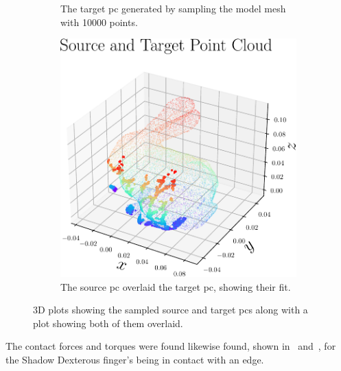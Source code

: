 \begin{figure}[!h]
\begin{subfigure}[b]{0.3\textwidth}
		\caption{The target \gls{pc} generated by sampling the model mesh with \num{10 000} points.}
		\label{fig:pc-target}
	\end{subfigure}
	\begin{subfigure}[b]{0.3\textwidth}
		\centering
		\includegraphics[width=\textwidth]{chapters/1-tactile-perception/fig/matplotlib/pc_source_target.pdf}
		\caption{The source \gls{pc} overlaid the target \gls{pc}, showing their fit.}
		\label{fig:pc-source-and-target}
	\end{subfigure}
	\caption{3D plots showing the sampled source and target \gls{pc}s along with a plot showing both of them overlaid.}
	\label{fig:contact-position-gazebo}
\end{figure}

The contact forces and torques were found likewise found, shown in~ and~, for the Shadow Dexterous finger's being in contact with an edge.

